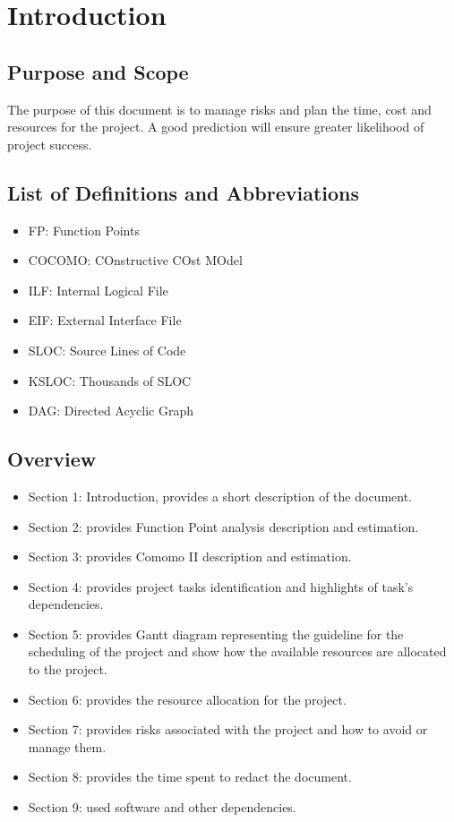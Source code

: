 \documentclass{article}
\begin{document}
	\newpage
	
	\section{Introduction}
		\subsection{Purpose and Scope}
		The purpose of this document is to manage risks and plan the time, cost and resources for the project. A good prediction will ensure greater likelihood of project success.
		\subsection{List of Definitions and Abbreviations}
			\begin{itemize}
				\item FP: Function Points
				\item COCOMO: COnstructive COst MOdel
				\item ILF: Internal Logical File
				\item EIF: External Interface File
				\item SLOC: Source Lines of Code
				\item KSLOC: Thousands of SLOC
				\item DAG: Directed Acyclic Graph
			\end{itemize}
		\subsection{Overview}
		\begin{itemize}
			\item Section 1: Introduction, provides a short description of the document.
			\item Section 2: provides Function Point analysis description and estimation.
			\item Section 3: provides Comomo II description and estimation.
			\item Section 4: provides project tasks identification and highlights of task's dependencies.
			\item Section 5: provides Gantt diagram representing the guideline for the scheduling of the project and show how the available resources are allocated to the project.
			\item Section 6: provides the resource allocation for the project.
			\item Section 7: provides risks associated with the project and how to avoid or manage them.
			\item Section 8: provides the time spent to redact the document.
			\item Section 9: used software and other dependencies.
		\end{itemize}
		
\end{document}
